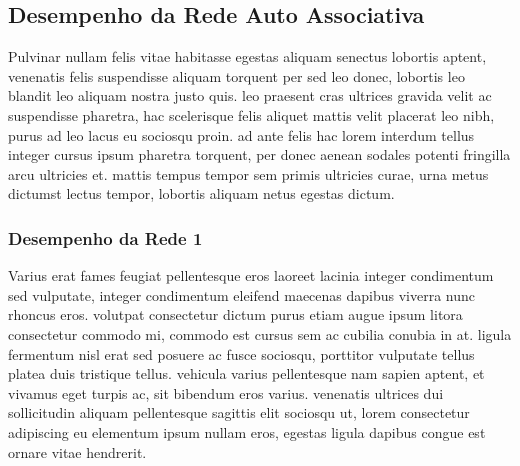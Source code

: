 \subsection{Desempenho da Rede Auto Associativa}

Pulvinar nullam felis vitae habitasse egestas aliquam senectus lobortis aptent, venenatis felis suspendisse aliquam torquent per sed leo donec, lobortis leo blandit leo aliquam nostra justo quis. leo praesent cras ultrices gravida velit ac suspendisse pharetra, hac scelerisque felis aliquet mattis velit placerat leo nibh, purus ad leo lacus eu sociosqu proin. ad ante felis hac lorem interdum tellus integer cursus ipsum pharetra torquent, per donec aenean sodales potenti fringilla arcu ultricies et. mattis tempus tempor sem primis ultricies curae, urna metus dictumst lectus tempor, lobortis aliquam netus egestas dictum.

\subsubsection{Desempenho da Rede 1}

Varius erat fames feugiat pellentesque eros laoreet lacinia integer condimentum sed vulputate, integer condimentum eleifend maecenas dapibus viverra nunc rhoncus eros. volutpat consectetur dictum purus etiam augue ipsum litora consectetur commodo mi, commodo est cursus sem ac cubilia conubia in at. ligula fermentum nisl erat sed posuere ac fusce sociosqu, porttitor vulputate tellus platea duis tristique tellus. vehicula varius pellentesque nam sapien aptent, et vivamus eget turpis ac, sit bibendum eros varius. venenatis ultrices dui sollicitudin aliquam pellentesque sagittis elit sociosqu ut, lorem consectetur adipiscing eu elementum ipsum nullam eros, egestas ligula dapibus congue est ornare vitae hendrerit.


